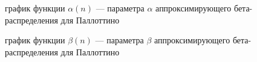 \documentclass[a4paper]{article}
\begin{document}
\begin{figure}[!]
	\caption{график функции $\alpha(n)$ — параметра $\alpha$ аппроксимирующего бета-распределения для Паллоттино}
	\label{image3}
\end{figure}

\begin{figure}[!]
	\caption{график функции $\beta(n)$ — параметра $\beta$ аппроксимирующего бета-распределения для Паллоттино}
	\label{image4}
\end{figure}
\end{document}
